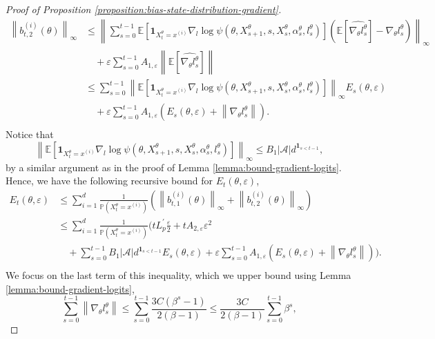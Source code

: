 \documentclass[11pt]{article}
\numberwithin{equation}{section}
\theoremstyle{definition}
\theoremstyle{remark}
\def\eps{\varepsilon}
\def\cA{\mathcal{A}}
\begin{document}
\begin{proof}[Proof of Proposition \ref{proposition:bias-state-distribution-gradient}]
\[
\begin{aligned}
    \left\|b_{t,2}^{(i)}(\theta) \right\|_{\infty} &\leq \left\| \sum_{s = 0}^{t-1} \mathbb E \left[ \mathbf 1_{X_t^\theta = x^{(i)}} \nabla_l \log \psi(\theta, X_{s + 1}^\theta,s, X_s^\theta, \alpha_s^\theta, l_s^\theta) \right] \left(\mathbb E \left[ \widehat{\nabla_\theta l_s^\theta} \right] - \nabla_\theta l_s^\theta \right) \right\|_{\infty} \\
    & \quad + \eps \sum_{s=0}^{t-1} A_{1, \eps} \left\|\mathbb E \left[\widehat{\nabla_\theta l_s^\theta}\right] \right\|  \\
    & \leq \sum_{s = 0}^{t-1} \left\| \mathbb E \left[ \mathbf 1_{X_t^\theta = x^{(i)}} \nabla_l \log \psi(\theta, X_{s + 1}^\theta, s,X_s^\theta, \alpha_s^\theta, l_s^\theta) \right] \right\|_\infty  E_s(\theta, \eps) \\
    &\quad + \eps \sum_{s=0}^{t-1} A_{1, \eps} \left(E_s(\theta, \eps) + \left\| \nabla_\theta l_s^\theta \right\|\right). \\ 
\end{aligned}
\]
Notice that 
\[
    \left\| \mathbb E \left[ \mathbf 1_{X_t^\theta = x^{(i)}} \nabla_l \log \psi(\theta, X_{s + 1}^\theta, s,X_s^\theta, \alpha_s^\theta, l_s^\theta) \right] \right\|_\infty 
    \leq B_1| \cA | d^{\mathbf 1_{s < t - 1}},
\]
by a similar argument as in the proof of Lemma \ref{lemma:bound-gradient-logits}. 
Hence, we have the following recursive bound for $E_t(\theta, \eps)$,
\begin{equation}
    \label{eq:recursive-bound-Et-raw}
\begin{aligned}
 E_t (\theta, \eps) & \leq \sum_{i = 1}^d \frac{1}{\mathbb P (X_t^\theta = x^{(i)})} \left(\left\| b_{t,1}^{(i)} (\theta) \right\|_{\infty} + \left\| b_{t,2}^{(i)} (\theta) \right\|_{\infty} \right) \\
 & \leq \sum_{i=1}^d \frac{1}{\mathbb P (X_t^\theta = x^{(i)})} \Bigg( t L^\prime_p \frac{\eps}{2} + t A_{2, \eps} \eps^2 \\
 &  \quad + \sum_{s = 0}^{t-1} B_1 | \cA | d^{\mathbf 1_{s < t - 1}} E_s (\theta, \eps) + \eps \sum_{s=0}^{t-1} A_{1, \eps} \left( E_s (\theta, \eps) + \left\| \nabla_\theta l_s^\theta \right\| \right)\Bigg).\\
\end{aligned}
\end{equation}
We focus on the last term of this inequality, which we upper bound using Lemma \ref{lemma:bound-gradient-logits},
\[
\sum_{s=0}^{t-1} \left\| \nabla_\theta l_s^\theta \right\| \leq \sum_{s=0}^{t-1} \frac{3 C (\beta^s - 1)}{2(\beta - 1)} \leq \frac{3 C}{2(\beta - 1)} \sum_{s=0}^{t-1}\beta^s,
\]
\end{proof}
\end{document}

